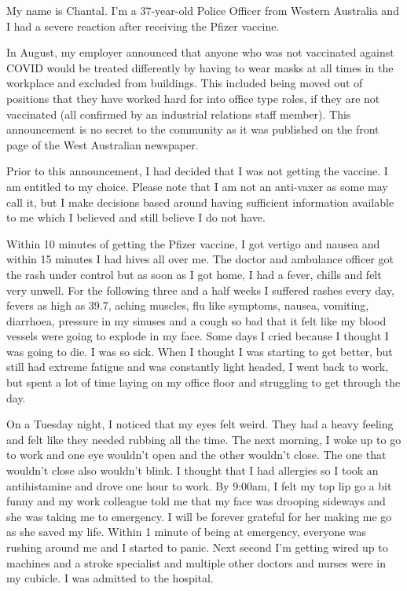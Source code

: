 My name is Chantal. I’m a 37-year-old Police Officer from Western Australia and
I had a severe reaction after receiving the Pfizer vaccine.

In August, my employer announced that anyone who was not vaccinated against
COVID would be treated differently by having to wear masks at all times in the
workplace and excluded from buildings. This included being moved out of
positions that they have worked hard for into office type roles, if they are not
vaccinated (all confirmed by an industrial relations staff member). This
announcement is no secret to the community as it was published on the front page
of the West Australian newspaper.

Prior to this announcement, I had decided that I was not getting the vaccine. I
am entitled to my choice. Please note that I am not an anti-vaxer as some may
call it, but I make decisions based around having sufficient information
available to me which I believed and still believe I do not have.

Within 10 minutes of getting the Pfizer vaccine, I got vertigo and nausea and
within 15 minutes I had hives all over me. The doctor and ambulance officer got
the rash under control but as soon as I got home, I had a fever, chills and felt
very unwell. For the following three and a half weeks I suffered rashes every
day, fevers as high as 39.7, aching muscles, flu like symptoms, nausea,
vomiting, diarrhoea, pressure in my sinuses and a cough so bad that it felt like
my blood vessels were going to explode in my face. Some days I cried because I
thought I was going to die. I was so sick. When I thought I was starting to get
better, but still had extreme fatigue and was constantly light headed, I went
back to work, but spent a lot of time laying on my office floor and struggling
to get through the day.

On a Tuesday night, I noticed that my eyes felt weird. They had a heavy feeling
and felt like they needed rubbing all the time. The next morning, I woke up to
go to work and one eye wouldn’t open and the other wouldn’t close. The one that
wouldn’t close also wouldn’t blink. I thought that I had allergies so I took an
antihistamine and drove one hour to work. By 9:00am, I felt my top lip go a bit
funny and my work colleague told me that my face was drooping sideways and she
was taking me to emergency. I will be forever grateful for her making me go as
she saved my life. Within 1 minute of being at emergency, everyone was rushing
around me and I started to panic. Next second I’m getting wired up to machines
and a stroke specialist and multiple other doctors and nurses were in my
cubicle. I was admitted to the hospital.

